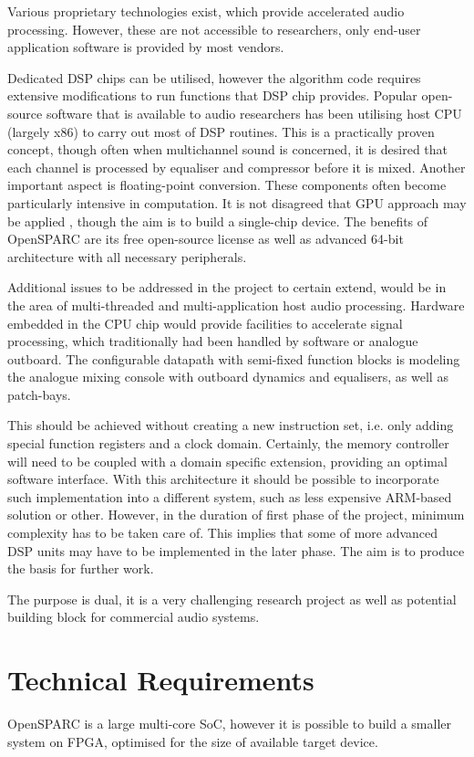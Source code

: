 \documentclass[twocolumn]{article}
\begin{document}
  Various proprietary technologies exist, which provide accelerated
  audio processing. However, these are not accessible to researchers,
  only end-user application software is provided by most vendors.


  Dedicated DSP chips can be utilised, however the algorithm code
  requires extensive modifications to run functions that DSP chip
  provides. Popular open-source software that is available to audio
  researchers \cite{wiki:pd,wiki:sc,wiki:cs} has been utilising host
  CPU (largely x86) to carry out most of DSP routines. This is a
  practically proven concept, though often when multichannel sound
  is concerned, it is desired that each channel is processed by equaliser
  and compressor before it is mixed. Another important aspect is
  floating-point conversion. These components often become particularly
  intensive in computation. It is not disagreed that GPU approach may
  be applied \cite{moore2009the,savioja2010real,tsingos2009using},
  though the aim is to build a single-chip device.
  The benefits of OpenSPARC are its free open-source license as well
  as advanced 64-bit architecture \cite{weaver1994sparc} with all
  necessary peripherals.

  Additional issues to be addressed in the project to certain extend,
  would be in the area of multi-threaded and multi-application host
  audio processing. Hardware embedded in the CPU chip would provide
  facilities to accelerate signal processing, which traditionally
  had been handled by software or analogue outboard. The configurable
  datapath with semi-fixed function blocks is modeling the analogue
  mixing console with outboard dynamics and equalisers, as well as
  patch-bays.

  This should be achieved without creating a new instruction set,
  i.e. only adding special function registers and a clock domain.
  Certainly, the memory controller will need to be coupled with
  a domain specific extension, providing an optimal software
  interface. With this architecture it should be possible to 
  incorporate such implementation into a different system,
  such as less expensive ARM-based solution or other.
  However, in the duration of first phase of the project, minimum
  complexity has to be taken care of. This implies that some of
  more advanced DSP units may have to be implemented in the later
  phase. The aim is to produce the basis for further work. 
  
  The purpose is dual, it is a very challenging research project
  as well as potential building block for commercial audio systems.

\section{Technical Requirements}

  OpenSPARC is a large multi-core SoC, however it is possible
  to build a smaller system \cite{page:opensparc:fpga} on FPGA,
  optimised for the size of available target device.
  




\end{document}
